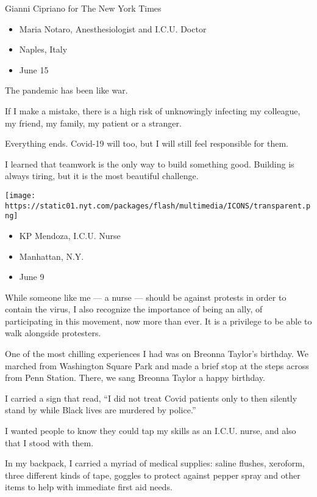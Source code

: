 Gianni Cipriano for The New York Times

\begin{itemize}
\tightlist
\item
  Maria Notaro, Anesthesiologist and I.C.U. Doctor
\item
  Naples, Italy
\item
  June 15
\end{itemize}

The pandemic has been like war.

If I make a mistake, there is a high risk of unknowingly infecting my
colleague, my friend, my family, my patient or a stranger.

Everything ends. Covid-19 will too, but I will still feel responsible
for them.

I learned that teamwork is the only way to build something good.
Building is always tiring, but it is the most beautiful challenge.

\texttt{[image: https://static01.nyt.com/packages/flash/multimedia/ICONS/transparent.png]}

\begin{itemize}
\tightlist
\item
  KP Mendoza, I.C.U. Nurse
\item
  Manhattan, N.Y.
\item
  June 9
\end{itemize}

While someone like me --- a nurse --- should be against protests in
order to contain the virus, I also recognize the importance of being an
ally, of participating in this movement, now more than ever. It is a
privilege to be able to walk alongside protesters.

One of the most chilling experiences I had was on Breonna Taylor's
birthday. We marched from Washington Square Park and made a brief stop
at the steps across from Penn Station. There, we sang Breonna Taylor a
happy birthday.

I carried a sign that read, ``I did not treat Covid patients only to
then silently stand by while Black lives are murdered by police.''

I wanted people to know they could tap my skills as an I.C.U. nurse, and
also that I stood with them.

In my backpack, I carried a myriad of medical supplies: saline flushes,
xeroform, three different kinds of tape, goggles to protect against
pepper spray and other items to help with immediate first aid needs.

